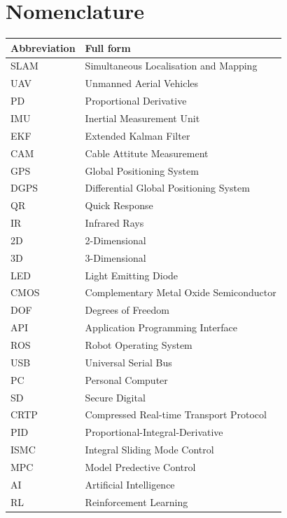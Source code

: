 \chapter*{Nomenclature}


\begin{table}[H]
    \centering
    \begin{tabular}{@{}p{}p{}@{}}
        \hline
        \textbf{Abbreviation} & \textbf{Full form} \\
        \hline
        SLAM & Simultaneous Localisation and Mapping \\
        UAV & Unmanned Aerial Vehicles \\
        PD & Proportional Derivative\\
        IMU & Inertial Measurement Unit\\
        EKF & Extended Kalman Filter\\
        CAM & Cable Attitute Measurement\\
        GPS & Global Positioning System \\
        DGPS & Differential Global Positioning System \\
        QR & Quick Response\\
        IR & Infrared Rays \\
        2D & 2-Dimensional\\
        3D & 3-Dimensional\\
        LED & Light Emitting Diode \\
        CMOS & Complementary Metal Oxide Semiconductor \\
        DOF & Degrees of Freedom \\
        API & Application Programming Interface \\
        ROS & Robot Operating System \\
        USB & Universal Serial Bus \\
        PC & Personal Computer \\
        SD & Secure Digital \\
        CRTP & Compressed Real-time Transport Protocol \\
        PID & Proportional-Integral-Derivative \\
        ISMC & Integral Sliding Mode Control \\
        MPC & Model Predective Control \\
        AI & Artificial Intelligence \\
        RL & Reinforcement Learning \\
        \hline
    \end{tabular}
    \label{tab:Abbreviations}
\end{table}


